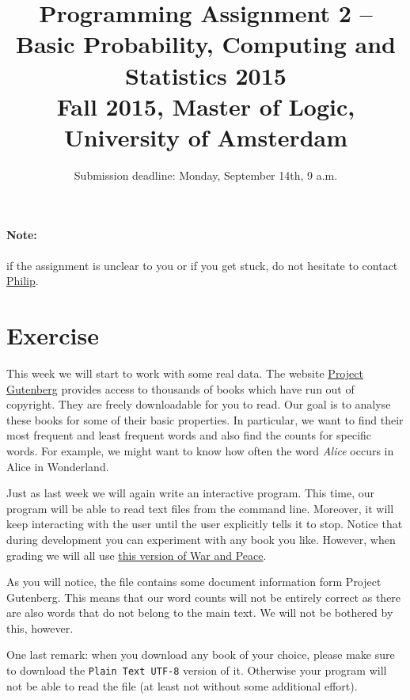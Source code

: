 \documentclass[11pt, leqno, a4paper]{article}
\title{Programming Assignment 2 -- Basic Probability, Computing and Statistics 2015 \\[2mm]
\large{Fall 2015, Master of Logic, University of Amsterdam}}
\author{}
\date{Submission deadline: Monday, September 14th, 9 a.m.}
\begin{document}
\maketitle

\paragraph{Note:} if the assignment is unclear to you or if you get stuck, do not hesitate to contact \href{mailto:P.Schulz@uva.nl}{Philip}.

\section{Exercise}
This week we will start to work with some real data. The website \href{https://www.gutenberg.org/}{Project Gutenberg} provides access to thousands of
books which have run out of copyright. They are freely downloadable for you to read. Our goal is to analyse these books for some of their basic 
properties. In particular, we want to find their most frequent and least frequent words and also find the counts for specific words. For example,
we might want to know how often the word \textit{Alice} occurs in Alice in Wonderland.

Just as last week we will again write an interactive program. This time, our program will be able to read text files from the command line. 
Moreover, it will keep interacting with the user until the user explicitly tells it to stop. Notice that during development you can experiment
with any book you like. However, when grading we will all use \href{https://www.gutenberg.org/cache/epub/2600/pg2600.txt}{this version of War and Peace}.

As you will notice, the file contains some document information form Project Gutenberg. This means that our word counts will not be entirely correct as
there are also words that do not belong to the main text. We will not be bothered by this, however.

One last remark: when you download any book of your choice, please make sure to download the \texttt{Plain Text UTF-8} version of it. Otherwise your
program will not be able to read the file (at least not without some additional effort).
\end{document}
